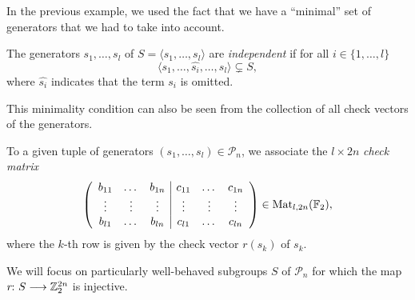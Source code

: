\documentclass[a4paper, oneside, 12pt]{amsart}
\newcommand*{\PauliGroup}{\ensuremath{\mathcal{P}}}
\begin{document}
In the previous example, we used the fact that we have a ``minimal'' set of generators that we had to take into account.

\begin{definition}\label{def:minimal-set-of-generators}
  The generators \( s_1, \dots, s_l \) of \( S=\langle s_{1}, \dots , s_{l}\rangle \) are  \emph{independent} if for all \( i \in \{1, \dots, l\} \)
  \begin{equation}
    \langle s_1, \dots, \widehat{s_i}, \dots, s_l \rangle \subsetneq S,
  \end{equation}
where \( \widehat{s_i} \) indicates that the term \( s_i \) is omitted.
\end{definition}

This minimality condition can also be seen from the collection of all check vectors of the generators.

\begin{definition}\label{def:check-matrix}
  To a given tuple of generators \((s_{1}, \dots, s_{l})\in \PauliGroup_{n}\), we associate the \(l\times 2n\) \emph{check matrix}
  \begin{equation*}
    \left(
      \begin{array}{c c c | c c c}
        b_{11} & \dots & b_{1n} & c_{11} & \dots & c_{1n} \\
        \vdots & \vdots & \vdots & \vdots & \vdots & \vdots \\
        b_{l1} & \dots & b_{ln} & c_{l1} & \dots & c_{ln}
      \end{array}
      \right) \in \operatorname{Mat}_{l,2n}( \mathbb{F}_{2}),
    \end{equation*}
    where the \(k\)-th row is given by the check vector \(r(s_{k})\) of \(s_{k}\).
  \end{definition}

  We will focus on particularly well-behaved subgroups \(S\) of \(\PauliGroup_{n}\) for which the map \(r \from S \to \mathbb{Z}_{2}^{2n}\) is injective.
\end{document}
